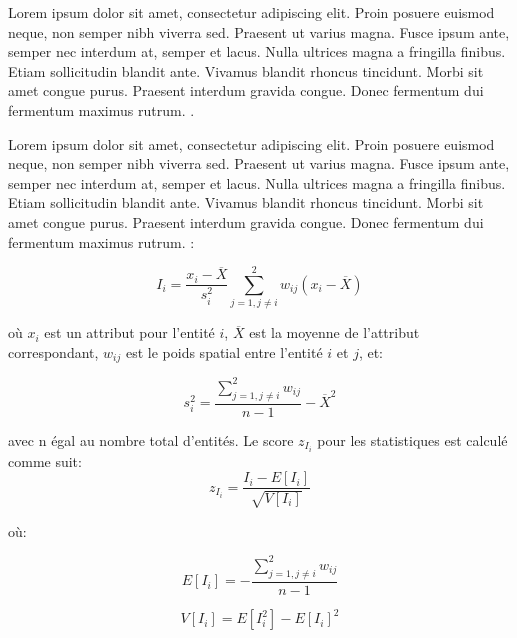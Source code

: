 \medskip

Lorem ipsum dolor sit amet, consectetur adipiscing elit. Proin posuere euismod neque, non semper nibh viverra sed. Praesent ut varius magna. Fusce ipsum ante, semper nec interdum at, semper et lacus. Nulla ultrices magna a fringilla finibus. Etiam sollicitudin blandit ante. Vivamus blandit rhoncus tincidunt. Morbi sit amet congue purus. Praesent interdum gravida congue. Donec fermentum dui fermentum maximus rutrum. \parencite{chang_introduction_2019}.

\medskip

Lorem ipsum dolor sit amet, consectetur adipiscing elit. Proin posuere euismod neque, non semper nibh viverra sed. Praesent ut varius magna. Fusce ipsum ante, semper nec interdum at, semper et lacus. Nulla ultrices magna a fringilla finibus. Etiam sollicitudin blandit ante. Vivamus blandit rhoncus tincidunt. Morbi sit amet congue purus. Praesent interdum gravida congue. Donec fermentum dui fermentum maximus rutrum. \parencite{hart_kernel_2014} :

\medskip

\begin{equation}
  I_i = \frac{x_i - \overline{X}}{ s_i^{2}} \sum_{j=1,j\neq i}^2 w_{ij}  (x_i - \overline{X})
\end{equation}

\medskip

où $x_i$ est un attribut pour l'entité $i$,  $\overline{X}$ est la moyenne de l'attribut correspondant, $w_{ij}$ est le poids spatial entre l'entité $i$ et $j$, et:

\medskip

\begin{equation}
  s_i^2 = \frac{\sum_{j=1,j\neq i}^2 w_{ij}  }{n-1} - \overline{X}^2
\end{equation}

\medskip
avec n égal au nombre total d'entités.
Le score $z_{I_{i}}$ pour les statistiques est calculé comme suit:
\medskip
\begin{equation}
  z_{I_{i}} = \frac{I_i - E [I_i]}{\sqrt{V[I_i]}}
\end{equation}

où:
\medskip

\begin{equation}
  E[I_i] = -\frac{\sum_{j=1,j\neq i}^2 w_{ij} }{n-1}
\end{equation}

\begin{equation}
  V[I_i] = E[I_i^2] - E[I_i]^2
\end{equation}

